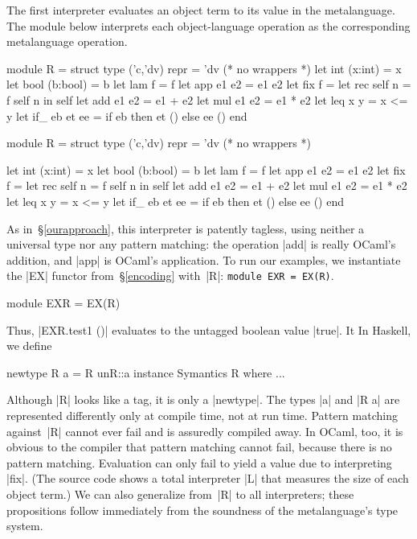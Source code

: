 The first interpreter evaluates an object term to its value in the
metalanguage.  The module below interprets each object\hyp language
operation as the corresponding metalanguage operation.
\ifshort
\begin{code3}
module R = struct type ('c,'dv) repr = 'dv (* no wrappers *)
  let int  (x:int)  = x         let bool (b:bool) = b
  let lam  f        = f         let app  e1 e2    = e1 e2
  let fix  f        = let rec self n = f self n in self
  let add  e1 e2    = e1 + e2   let mul  e1 e2    = e1 * e2
  let leq  x y      = x <= y
  let if_  eb et ee = if eb then et () else ee () end
\end{code3}
\else
\begin{code}
module R = struct
  type ('c,'dv) repr = 'dv (* no wrappers *)

  let int  (x:int)  = x
  let bool (b:bool) = b
  let lam  f        = f
  let app  e1 e2    = e1 e2
  let fix  f        = let rec self n = f self n in self
  let add  e1 e2    = e1 + e2
  let mul  e1 e2    = e1 * e2
  let leq  x y      = x <= y
  let if_  eb et ee = if eb then et () else ee ()
end
\end{code}
\fi
%
As in~\S\ref{ourapproach},
this interpreter is patently tagless, using neither a universal type nor
any pattern matching: the operation |add| is really
OCaml's addition, and |app| is OCaml's application. To run our
examples, we instantiate the |EX| functor from~\S\ref{encoding}
with~|R|\ifshort: \texttt{module EXR = EX(R)}\fi.
\ifshort\else
\begin{code}
module EXR = EX(R)
\end{code}
\fi
Thus, |EXR.test1 ()| evaluates to the untagged boolean value |true|.
\ifshort It \else
In Haskell, we define
\begin{code}
newtype R a = R {unR::a}
instance Symantics R where ...
\end{code}
Although |R| looks like a tag, it is only
a |newtype|.  The types |a| and |R a| are represented differently
only at compile time, not at run time.  Pattern matching against~|R|
cannot ever fail and is assuredly compiled away.
In OCaml, too, it
\fi is obvious to the compiler that
pattern matching cannot fail, because there is no
pattern matching. Evaluation can only fail to yield a value
due to interpreting |fix|.
\ifshort
(The source code shows a total interpreter |L| that measures
the size of each object term.)
\fi
\ifshort
We can also generalize from~|R| to all interpreters;
these propositions follow immediately from the soundness of the
metalanguage's type system.
